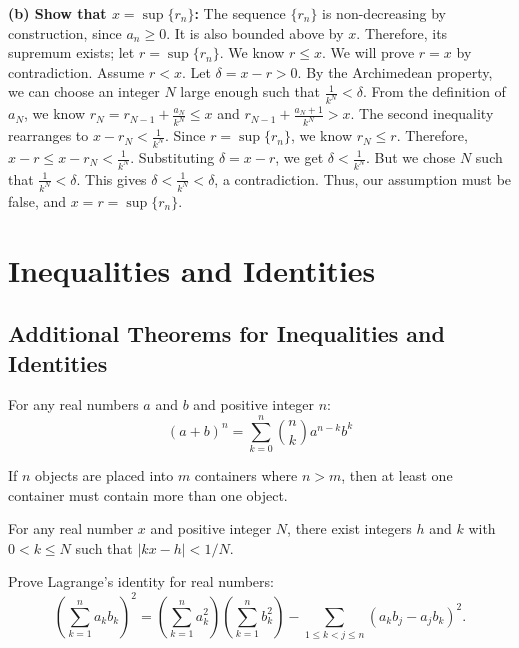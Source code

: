 \textbf{(b) Show that \( x = \sup \{ r_n \} \):}
The sequence $\{r_n\}$ is non-decreasing by construction, since $a_n \ge 0$. It is also bounded above by $x$. Therefore, its supremum exists; let $r = \sup\{r_n\}$. We know $r \le x$.
We will prove $r=x$ by contradiction. Assume $r < x$. Let $\delta = x - r > 0$.
By the Archimedean property, we can choose an integer $N$ large enough such that $\frac{1}{k^N} < \delta$.
From the definition of $a_N$, we know $r_N = r_{N-1} + \frac{a_N}{k^N} \le x$ and $r_{N-1} + \frac{a_N+1}{k^N} > x$.
The second inequality rearranges to $x - r_N < \frac{1}{k^N}$.
Since $r = \sup\{r_n\}$, we know $r_N \leq r$.
Therefore, $x - r \leq x - r_N < \frac{1}{k^N}$.
Substituting $\delta = x-r$, we get $\delta < \frac{1}{k^N}$.
But we chose $N$ such that $\frac{1}{k^N} < \delta$. This gives $\delta < \frac{1}{k^N} < \delta$, a contradiction.
Thus, our assumption must be false, and $x = r = \sup\{r_n\}$.


\section{Inequalities and Identities}

\subsection*{Additional Theorems for Inequalities and Identities}

\begin{theorem}
For any real numbers $a$ and $b$ and positive integer $n$:
\[
(a + b)^n = \sum_{k=0}^n \binom{n}{k} a^{n-k} b^k
\]
\end{theorem}

\begin{theorem}
If $n$ objects are placed into $m$ containers where $n > m$, then at least one container must contain more than one object.
\end{theorem}

\begin{theorem}
For any real number $x$ and positive integer $N$, there exist integers $h$ and $k$ with $0 < k \leq N$ such that $|kx - h| < 1/N$.
\end{theorem}

\begin{problembox}
Prove Lagrange's identity for real numbers:
\[
\left( \sum_{k=1}^n a_k b_k \right)^2 = \left( \sum_{k=1}^n a_k^2 \right)\left( \sum_{k=1}^n b_k^2 \right) - \sum_{1 \leq k < j \leq n} (a_k b_j - a_j b_k)^2.
\]
\end{problembox}

